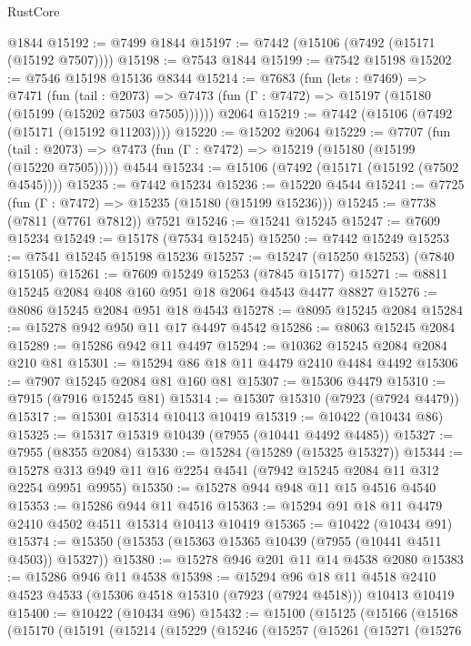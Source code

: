 \begin{lexlean}{RustCore}
\begin{coremodule}
    @1844
@15192 := @7499 @1844
@15197 := @7442 (@15106 (@7492 (@15171 (@15192 @7507))))
@15198 := @7543 @1844
@15199 := @7542 @15198
@15202 := @7546 @15198 @15136 @8344
@15214 := @7683
    (fun (lets : @7469) =>
    @7471
      (fun (tail : @2073) =>
      @7473 (fun (Γ : @7472) => @15197 (@15180 (@15199 (@15202 @7503 @7505))))))
    @2064
@15219 := @7442 (@15106 (@7492 (@15171 (@15192 @11203))))
@15220 := @15202 @2064
@15229 := @7707
    (fun (tail : @2073) => @7473 (fun (Γ : @7472) => @15219 (@15180 (@15199 (@15220 @7505)))))
    @4544
@15234 := @15106 (@7492 (@15171 (@15192 (@7502 @4545))))
@15235 := @7442 @15234
@15236 := @15220 @4544
@15241 := @7725 (fun (Γ : @7472) => @15235 (@15180 (@15199 @15236)))
@15245 := @7738 (@7811 (@7761 @7812)) @7521
@15246 := @15241 @15245
@15247 := @7609 @15234
@15249 := @15178 (@7534 @15245)
@15250 := @7442 @15249
@15253 := @7541 @15245 @15198 @15236
@15257 := @15247 (@15250 @15253) (@7840 @15105)
@15261 := @7609 @15249 @15253 (@7845 @15177)
@15271 := @8811 @15245 @2084 @408 @160 @951 @18 @2064 @4543 @4477 @8827
@15276 := @8086 @15245 @2084 @951 @18 @4543
@15278 := @8095 @15245 @2084
@15284 := @15278 @942 @950 @11 @17 @4497 @4542
@15286 := @8063 @15245 @2084
@15289 := @15286 @942 @11 @4497
@15294 := @10362 @15245 @2084 @2084 @210 @81
@15301 := @15294 @86 @18 @11 @4479 @2410 @4484 @4492
@15306 := @7907 @15245 @2084 @81 @160 @81
@15307 := @15306 @4479
@15310 := @7915 (@7916 @15245 @81)
@15314 := @15307 @15310 (@7923 (@7924 @4479))
@15317 := @15301 @15314 @10413 @10419
@15319 := @10422 (@10434 @86)
@15325 := @15317 @15319 @10439 (@7955 (@10441 @4492 @4485))
@15327 := @7955 (@8355 @2084)
@15330 := @15284 (@15289 (@15325 @15327))
@15344 := @15278 @313 @949 @11 @16 @2254 @4541 (@7942 @15245 @2084 @11 @312 @2254 @9951 @9955)
@15350 := @15278 @944 @948 @11 @15 @4516 @4540
@15353 := @15286 @944 @11 @4516
@15363 := @15294 @91 @18 @11 @4479 @2410 @4502 @4511 @15314 @10413 @10419
@15365 := @10422 (@10434 @91)
@15374 := @15350 (@15353 (@15363 @15365 @10439 (@7955 (@10441 @4511 @4503)) @15327))
@15380 := @15278 @946 @201 @11 @14 @4538 @2080
@15383 := @15286 @946 @11 @4538
@15398 := @15294
    @96
    @18
    @11
    @4518
    @2410
    @4523
    @4533
    (@15306 @4518 @15310 (@7923 (@7924 @4518)))
    @10413
    @10419
@15400 := @10422 (@10434 @96)
@15432 := @15100
    (@15125
      (@15166
        (@15168
          (@15170
            (@15191
              (@15214
                (@15229
                  (@15246
                    (@15257
                      (@15261
                        (@15271
                          (@15276

\end{coremodule}
\end{lexlean}
